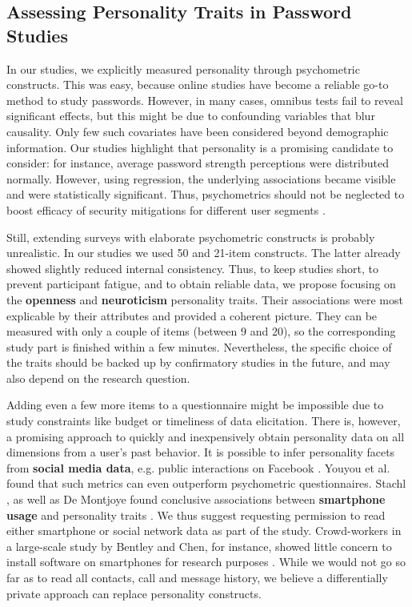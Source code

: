 \subsection{Assessing Personality Traits in Password Studies}
In our studies, we explicitly measured personality through psychometric constructs. This was easy, because online studies have become a reliable go-to method to study passwords. However, in many cases, omnibus tests fail to reveal significant effects, but this might be due to confounding variables that blur causality. Only few such covariates have been considered beyond demographic information. Our studies highlight that personality is a promising candidate to consider: for instance, average password strength perceptions were distributed normally. However, using regression, the underlying associations became visible and were statistically significant. Thus, psychometrics should not be neglected to boost efficacy of security mitigations for different user segments \cite{Egelman2015AverageUser}. 

Still, extending surveys with elaborate psychometric constructs is probably unrealistic. In our studies we used 50 and 21-item constructs. The latter already showed slightly reduced internal consistency. Thus, to keep studies short, to prevent participant fatigue, and to obtain reliable data, we propose focusing on the \textbf{openness} and \textbf{neuroticism} personality traits. Their associations were most explicable by their attributes and provided a coherent picture. They can be measured with only a couple of items (between 9 and 20), so the corresponding study part is finished within a few minutes. Nevertheless, the specific choice of the traits should be backed up by confirmatory studies in the future, and may also depend on the research question.

Adding even a few more items to a questionnaire might be impossible due to study constraints like budget or timeliness of data elicitation. There is, however, a promising approach to quickly and inexpensively obtain personality data on all dimensions from a user's past behavior. It is possible to infer personality facets from \textbf{social media data}, e.g. public interactions on Facebook \cite{Youyou2015Personality}. Youyou et al. found that such metrics can even outperform psychometric questionnaires. Stachl \etal, as well as De Montjoye \etal found conclusive associations between \textbf{smartphone usage} and personality traits \cite{DeMontjoye2013, Stachl2017PersonalitySmartphones}. We thus suggest requesting permission to read either smartphone or social network data as part of the study. Crowd-workers in a large-scale study by Bentley and Chen, for instance, showed little concern to install software on smartphones for research purposes \cite{Bentley2015Phonebook}. While we would not go so far as to read all contacts, call and message history, we believe a differentially private approach can replace personality constructs. 

